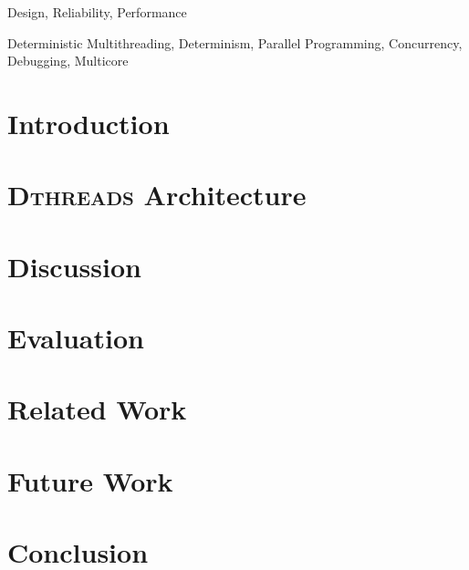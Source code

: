 \documentclass{sigplanconf}
\newcommand{\Dthreads}{\textsc{Dthreads}}
\begin{document}

\terms
Design, Reliability, Performance

\keywords
Deterministic Multithreading, Determinism, Parallel Programming, Concurrency, Debugging,
Multicore



\section{Introduction}


\section{\Dthreads{} Architecture}


\section{Discussion}


\section{Evaluation}


\section{Related Work}


\section{Future Work}


\section{Conclusion}


{


}
\end{document}
